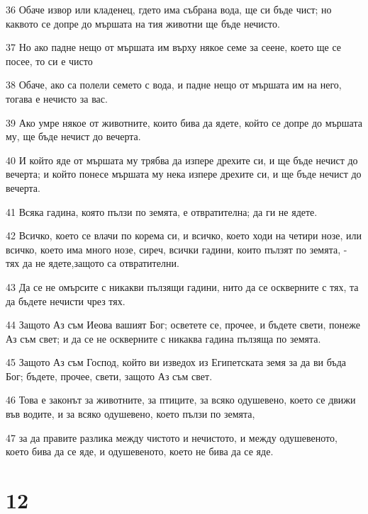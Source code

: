 \par 36 Обаче извор или кладенец, гдето има събрана вода, ще си бъде чист; но каквото се допре до мършата на тия животни ще бъде нечисто.
\par 37 Но ако падне нещо от мършата им върху някое семе за сеене, което ще се посее, то си е чисто
\par 38 Обаче, ако са полели семето с вода, и падне нещо от мършата им на него, тогава е нечисто за вас.
\par 39 Ако умре някое от животните, които бива да ядете, който се допре до мършата му, ще бъде нечист до вечерта.
\par 40 И който яде от мършата му трябва да изпере дрехите си, и ще бъде нечист до вечерта; и който понесе мършата му нека изпере дрехите си, и ще бъде нечист до вечерта.
\par 41 Всяка гадина, която пълзи по земята, е отвратителна; да ги не ядете.
\par 42 Всичко, което се влачи по корема си, и всичко, което ходи на четири нозе, или всичко, което има много нозе, сиреч, всички гадини, които пълзят по земята, - тях да не ядете,защото са отвратителни.
\par 43 Да се не омърсите с никакви пълзящи гадини, нито да се оскверните с тях, та да бъдете нечисти чрез тях.
\par 44 Защото Аз съм Иеова вашият Бог; осветете се, прочее, и бъдете свети, понеже Аз съм свет; и да се не оскверните с никаква гадина пълзяща по земята.
\par 45 Защото Аз съм Господ, който ви изведох из Египетската земя за да ви бъда Бог; бъдете, прочее, свети, защото Аз съм свет.
\par 46 Това е законът за животните, за птиците, за всяко одушевено, което се движи във водите, и за всяко одушевено, което пълзи по земята,
\par 47 за да правите разлика между чистото и нечистото, и между одушевеното, което бива да се яде, и одушевеното, което не бива да се яде.

\chapter{12}


